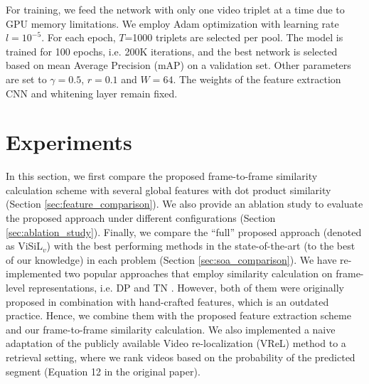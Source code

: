 \documentclass[10pt,twocolumn,letterpaper]{article}
\begin{document}
For training, we feed the network with only one video triplet at a time due to GPU memory limitations. We employ Adam optimization \cite{kingma2014} with learning rate $l=10^{-5}$. For each epoch, $T$=1000 triplets are selected per pool. The model is trained for 100 epochs, i.e. 200K iterations, and the best network is selected based on mean Average Precision (mAP) on a validation set. Other parameters are set to $\gamma = 0.5$, $r=0.1$ and $W=64$. The weights of the feature extraction CNN and whitening layer remain fixed.

\section{Experiments}
\label{sec:experiments}

In this section, we first compare the proposed frame-to-frame similarity calculation scheme with several global features with dot product similarity (Section \ref{sec:feature_comparison}). We also provide an ablation study to evaluate the proposed approach under different configurations (Section \ref{sec:ablation_study}). Finally, we compare the ``full'' proposed approach (denoted as ViSiL$_v$) with the best performing methods in the state-of-the-art (to the best of our knowledge) in each problem (Section \ref{sec:soa_comparison}). 
We have re-implemented two popular approaches that employ similarity calculation on frame-level representations, i.e. DP \cite{chou2015} and TN \cite{tan2009}. However, both of them were originally proposed in combination with hand-crafted features, which is an outdated practice. 
Hence, we combine them with the proposed feature extraction scheme and our frame-to-frame similarity calculation. We also implemented a naive adaptation of the publicly available  Video re-localization (VReL) method \cite{feng2018} to a retrieval setting, where we rank videos based on the probability of the predicted segment (Equation 12 in the original paper).
\end{document}
